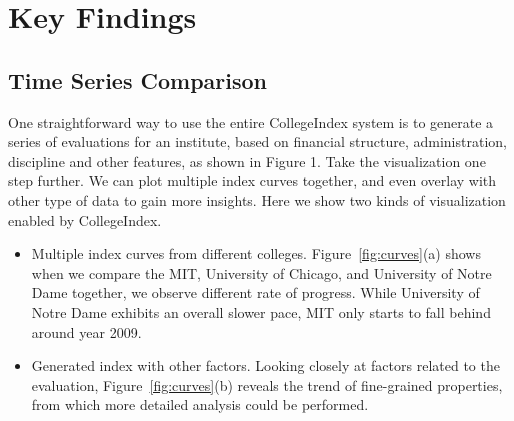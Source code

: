 \documentclass[11pt,letter]{article}
\begin{document}



\section{Key Findings}
\subsection{Time Series Comparison}

One straightforward way to use the entire CollegeIndex system is to generate a series of evaluations for an institute, based on financial structure, administration, discipline and other features, as shown in Figure 1. Take the visualization one step further. We can plot multiple index curves together, and even overlay with other type of data to gain more insights. Here we show two kinds of visualization enabled by CollegeIndex.
\begin{itemize}
\item Multiple index curves from different colleges. Figure~\ref{fig:curves}(a) shows when we 
compare the MIT, University of Chicago, and University of Notre Dame together, we observe different
rate of progress. While University of Notre Dame exhibits an overall slower pace, MIT only starts to 
fall behind around year 2009. 
\item Generated index with other factors. Looking closely at factors related to the evaluation,  
Figure~\ref{fig:curves}(b) reveals the trend of fine-grained properties, from which more 
detailed analysis could be performed.
\end{itemize}
\end{document}
